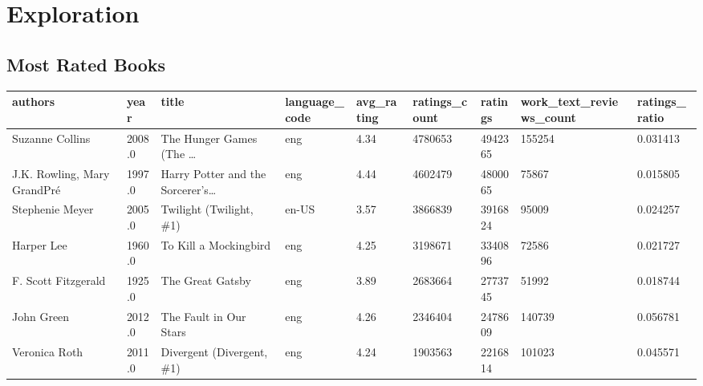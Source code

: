 \documentclass[handout]{beamer}
\begin{document}
\section%
{Exploration}\label{exploration}

\subsection{Most Rated Books}\label{most-rated-books}

\begin{frame}


\begin{table}
\begin{tabular}{lHlHHHHHZ}
\toprule
                     authors &  year &                                              title & language\_code &  avg\_rating &  ratings\_count &  ratings &  work\_text\_reviews\_count &  ratings\_ratio \\
\midrule
             Suzanne Collins &                     2008.0 &            The Hunger Games (The \ldots &           eng &            4.34 &        4780653 &             4942365 &                   155254 &       0.031413 \\
 J.K. Rowling, Mary GrandPr\'e &                     1997.0 &  Harry Potter and the Sorcerer's\ldots &           eng &            4.44 &        4602479 &             4800065 &                    75867 &       0.015805 \\
             Stephenie Meyer &                     2005.0 &                            Twilight (Twilight, \#1) &         en-US &            3.57 &        3866839 &             3916824 &                    95009 &       0.024257 \\
                  Harper Lee &                     1960.0 &                              To Kill a Mockingbird &           eng &            4.25 &        3198671 &             3340896 &                    72586 &       0.021727 \\
         F. Scott Fitzgerald &                     1925.0 &                                   The Great Gatsby &           eng &            3.89 &        2683664 &             2773745 &                    51992 &       0.018744 \\
                  John Green &                     2012.0 &                             The Fault in Our Stars &           eng &            4.26 &        2346404 &             2478609 &                   140739 &       0.056781 \\
               Veronica Roth &                     2011.0 &                          Divergent (Divergent, \#1) &           eng &            4.24 &        1903563 &             2216814 &                   101023 &       0.045571 \\

\end{tabular}
\end{table}
\end{frame}
\end{document}
